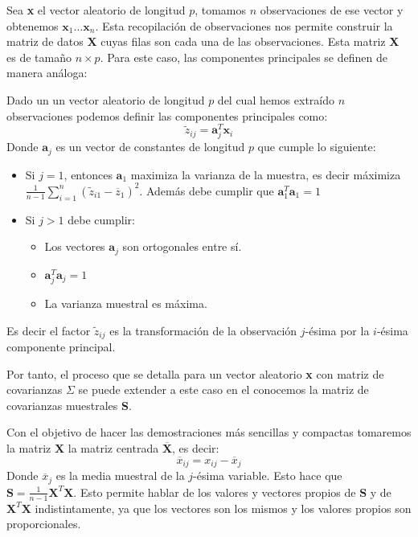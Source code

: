 \noindent Sea \textbf{x} el vector aleatorio de longitud $p$, tomamos $n$ observaciones de ese vector y obtenemos $\textbf{x}_1\ldots \textbf{x}_n$.
Esta recopilación de observaciones nos permite construir la matriz de datos $\textbf{X}$ cuyas filas son cada una de las observaciones. Esta matriz \textbf{X} es de tamaño $n\times p$. 
Para este caso, las componentes principales se definen de manera análoga:
\begin{defi}
Dado un un vector aleatorio de longitud $p$ del cual hemos extraído $n$ observaciones podemos definir las componentes principales como:
\begin{equation}
\widetilde{z}_{ij}=\textbf{a}^T_j\textbf{x}_i
\end{equation}
Donde $\textbf{a}_j$ es un vector de constantes de longitud $p$ que cumple lo siguiente:
\begin{itemize}
\item Si $j=1$, entonces $\textbf{a}_1$ maximiza la varianza de la muestra, es decir máximiza $\frac{1}{n-1}\sum_{i=1}^{n}(\widetilde{z}_{i1}-\overline{z}_1)^2$. Además debe cumplir que $\textbf{a}_1^T\textbf{a}_1=1$
\item Si $j>1$ debe cumplir:
\begin{itemize}
\item Los vectores $\textbf{a}_j$ son ortogonales entre sí. 
\item $\textbf{a}_j^T \textbf{a}_j=1$
\item La varianza muestral es máxima. 
\end{itemize}
\end{itemize}
Es decir el factor $\widetilde{z}_{ij}$ es la transformación de la observación $j$-ésima por la $i$-ésima componente principal. 
 
\end{defi}

\noindent Por tanto, el proceso que se detalla para un vector aleatorio \textbf{x} con matriz de covarianzas $\Sigma$ se puede extender a este caso en el conocemos la matriz de covarianzas muestrales \textbf{S}.

\noindent Con el objetivo de hacer las demostraciones más sencillas y compactas tomaremos la matriz $\textbf{X}$ la matriz centrada $\overline{\textbf{X}}$, es decir: 
\begin{equation}
\overline{x}_{ij}=x_{ij}-\overline{x}_j
\end{equation}
Donde $\overline{x}_j$ es la media muestral de la $j$-ésima variable. Esto hace que $\textbf{S}=\frac{1}{n-1}\textbf{X}^T\textbf{X}$. Esto permite hablar de los valores y vectores propios de \textbf{S} y de $\textbf{X}^T \textbf{X}$ indistintamente, ya que los vectores son los mismos y los valores propios son proporcionales. 



